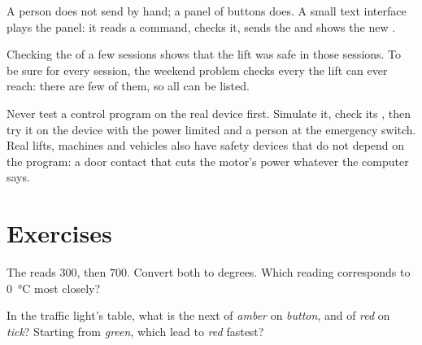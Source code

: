 A person does not send  by hand; a panel of buttons does. A small text interface plays the panel: it reads a
command, checks it, sends the  and shows the new .

\label{lst:g10:sensors-actuators-control:lift-menu}

\label{out:g10:sensors-actuators-control:lift-menu}

Checking the  of a few sessions shows that the lift was safe in those sessions. To be sure for every session,
the weekend problem checks every  the lift can ever reach: there are few of them, so all can be listed.

\begin{safety}
Never test a control program on the real device first. Simulate it, check its , then try it on the device
with the power limited and a person at the emergency switch. Real lifts, machines and vehicles also have safety
devices that do not depend on the program: a door contact that cuts the motor's power whatever the computer says.
\end{safety}

\section{Exercises}\label{sec:g10:sensors-actuators-control:exercises}

\begin{exercise}[$\star$]\label{exo:g10:sensors-actuators-control:1}
The  reads $300$, then $700$. Convert both to degrees. Which reading corresponds to $0$~°C most closely?
\end{exercise}

\begin{exercise}[$\star$]\label{exo:g10:sensors-actuators-control:2}
In the traffic light's table, what is the next  of \textit{amber} on \textit{button}, and of \textit{red} on
\textit{tick}? Starting from \textit{green}, which  lead to \textit{red} fastest?
\end{exercise}

